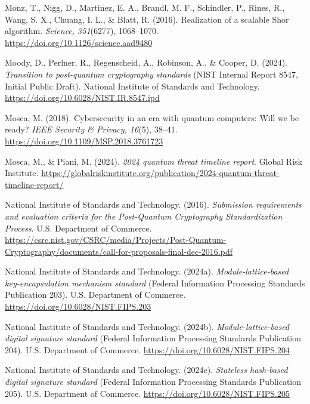 \documentclass[12pt,oneside]{report}
\begin{document}
Monz, T., Nigg, D., Martinez, E. A., Brandl, M. F., Schindler, P., Rines, R., Wang, S. X., Chuang, I. L., \& Blatt, R. (2016). Realization of a scalable Shor algorithm. \textit{Science, 351}(6277), 1068–1070. \url{https://doi.org/10.1126/science.aad9480}
\par

Moody, D., Perlner, R., Regenscheid, A., Robinson, A., \& Cooper, D. (2024). \textit{Transition to post-quantum cryptography standards} (NIST Internal Report 8547, Initial Public Draft). National Institute of Standards and Technology. \url{https://doi.org/10.6028/NIST.IR.8547.ipd}
\par

Mosca, M. (2018). Cybersecurity in an era with quantum computers: Will we be ready? \textit{IEEE Security \& Privacy, 16}(5), 38–41. \url{https://doi.org/10.1109/MSP.2018.3761723}
\par

Mosca, M., \& Piani, M. (2024). \textit{2024 quantum threat timeline report}. Global Risk Institute. \url{https://globalriskinstitute.org/publication/2024-quantum-threat-timeline-report/}
\par

National Institute of Standards and Technology. (2016). \textit{Submission requirements and evaluation criteria for the Post-Quantum Cryptography Standardization Process}. U.S. Department of Commerce. \url{https://csrc.nist.gov/CSRC/media/Projects/Post-Quantum-Cryptography/documents/call-for-proposals-final-dec-2016.pdf}
\par

National Institute of Standards and Technology. (2024a). \textit{Module-lattice-based key-encapsulation mechanism standard} (Federal Information Processing Standards Publication 203). U.S. Department of Commerce. \url{https://doi.org/10.6028/NIST.FIPS.203}
\par

National Institute of Standards and Technology. (2024b). \textit{Module-lattice-based digital signature standard} (Federal Information Processing Standards Publication 204). U.S. Department of Commerce. \url{https://doi.org/10.6028/NIST.FIPS.204}
\par

National Institute of Standards and Technology. (2024c). \textit{Stateless hash-based digital signature standard} (Federal Information Processing Standards Publication 205). U.S. Department of Commerce. \url{https://doi.org/10.6028/NIST.FIPS.205}
\par
\end{document}
